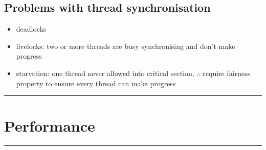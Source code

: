 \documentclass[10pt, multicolumn, a4paper]{article}
\begin{document}
\begin{multicols}{2}
	\subsection*{Problems with thread synchronisation}
	\begin{itemize}
	\item deadlocks
	\item livelocks: two or more threads are busy synchronising and don't make progress
	\item starvation: one thread never allowed into critical section, $\therefore$ require fairness property to ensure every thread can make progress
	\end{itemize}
\end{multicols}


\hrule
\section{Performance}
\hrule 
\end{document}
